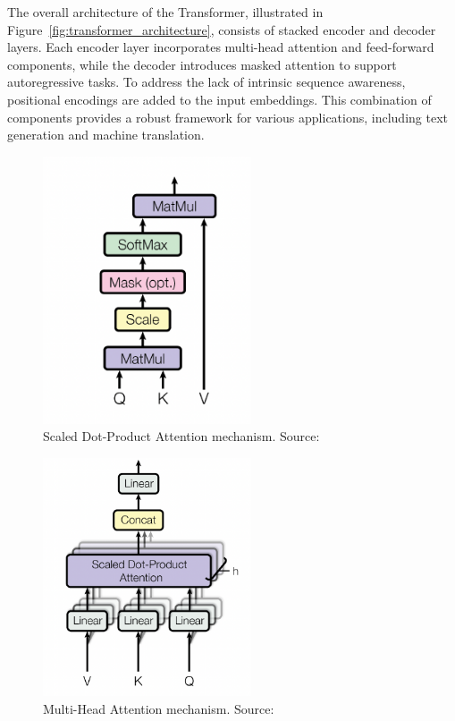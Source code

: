 The overall architecture of the Transformer, illustrated in Figure~\ref{fig:transformer_architecture}, consists of stacked encoder and decoder layers. Each encoder layer incorporates multi-head attention and feed-forward components, while the decoder introduces masked attention to support autoregressive tasks. To address the lack of intrinsic sequence awareness, positional encodings are added to the input embeddings. This combination of components provides a robust framework for various applications, including text generation and machine translation.

\begin{figure}[h!]
    \centering
    \includegraphics[width=0.55\textwidth]{Assets/scaled_dot_product_attention.png}
    \caption{Scaled Dot-Product Attention mechanism. Source: \cite{vaswani2017attention}}
    \label{fig:scaled_attention}
\end{figure}

\begin{figure}[h!]
    \centering
    \includegraphics[width=0.55\textwidth]{Assets/multi_head_attention.png}
    \caption{Multi-Head Attention mechanism. Source: \cite{vaswani2017attention}}
    \label{fig:multi_head_attention}
\end{figure}

